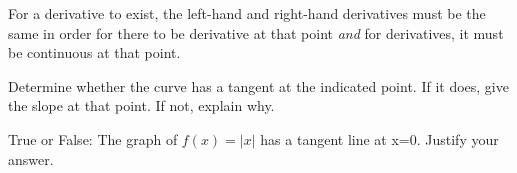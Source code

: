 For a derivative to exist, the left-hand and right-hand derivatives must be the same in order for there to be derivative at that point \textit{and} for derivatives, it must be continuous at that point.
\begin{questions}
    \question Determine whether the curve has a tangent at the indicated point. If it does, give the slope at that point. If not, explain why.
    \question True or False: The graph of $f(x)=|x|$ has a tangent line at x=0. Justify your answer.
\end{questions}



\newpage
